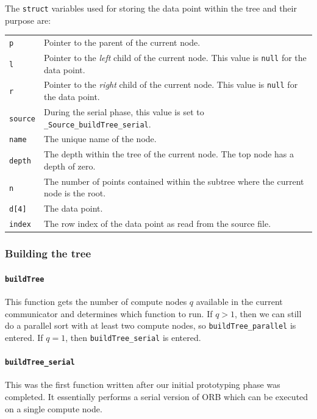 \documentclass{article}
\begin{document}
The \texttt{struct} variables used for storing the data point within the tree and their purpose are:

\begin{tabular}{l l}
 \texttt{p} & Pointer to the parent of the current node.  \\
 \texttt{l} & Pointer to the \textit{left} child of the current node. This value is \texttt{null} for the data point.  \\
 \texttt{r} & Pointer to the \textit{right} child of the current node. This value is \texttt{null} for the data point.  \\
 \texttt{source} & During the serial phase, this value is set to \texttt{\_Source\_buildTree\_serial}.  \\
 \texttt{name} & The unique name of the node.  \\
 \texttt{depth} & The depth within the tree of the current node. The top node has a depth of zero.  \\
 \texttt{n} & The number of points contained within the subtree where the current node is the root.  \\
 \texttt{d[4]} & The data point.  \\
 \texttt{index} & The row index of the data point as read from the source file.  \\
 \end{tabular}


%
%

\subsubsection{Building the tree}

\paragraph{\texttt{buildTree}}
This function gets the number of compute nodes $q$ available in the current communicator and determines which function to run. If $q>1$, then we can still do a parallel sort with at least two compute nodes, so \texttt{buildTree\_parallel} is entered. If $q=1$, then \texttt{buildTree\_serial} is entered.


%
%

\paragraph{\texttt{buildTree\_serial}}
This was the first function written after our initial prototyping phase was completed. It essentially performs a serial version of ORB which can be executed on a single compute node.
\end{document}

